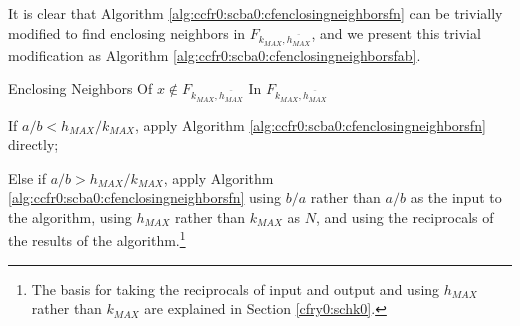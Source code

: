 It is clear that Algorithm \ref{alg:ccfr0:scba0:cfenclosingneighborsfn}
can be trivially modified to find enclosing neighbors
in $F_{k_{MAX},\overline{h_{MAX}}}$, and we present this
trivial modification as Algorithm
\ref{alg:ccfr0:scba0:cfenclosingneighborsfab}.

\begin{vworkalgorithmstatementpar}{Enclosing Neighbors Of 
                                   \mbox{\boldmath $x \notin F_{k_{MAX},\overline{h_{MAX}}}$} 
                                   In \mbox{\boldmath $F_{k_{MAX},\overline{h_{MAX}}}$}}
\label{alg:ccfr0:scba0:cfenclosingneighborsfab}
\begin{alglvl0}
\item If $a/b < h_{MAX}/k_{MAX}$, apply Algorithm 
      \ref{alg:ccfr0:scba0:cfenclosingneighborsfn} directly;

\item Else if $a/b > h_{MAX}/k_{MAX}$, apply Algorithm
      \ref{alg:ccfr0:scba0:cfenclosingneighborsfn} using $b/a$ rather
	  than $a/b$ as the input to the algorithm, using $h_{MAX}$ 
	  rather than $k_{MAX}$ as $N$, and
	  using the reciprocals of the results of the algorithm.\footnote{The
	  basis for taking the reciprocals of input and output and
	  using $h_{MAX}$ rather than $k_{MAX}$ are explained
	  in Section \ref{cfry0:schk0}.}

\end{alglvl0}
\end{vworkalgorithmstatementpar}


